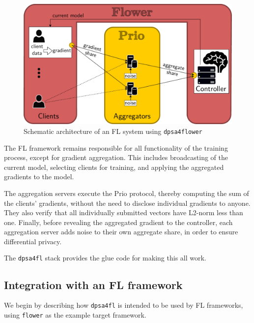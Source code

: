 \documentclass{article}
\begin{document}
\begin{figure}[h]
  \centering
  \includegraphics[width=\columnwidth]{assets/dpsa-overview-2-edit_no_explanations-2023-08-22.drawio-edit_rectangle_raw-joined-text_littleproblem-fixed-textfont-addnoise-fontsize.pdf}
  \caption{Schematic architecture of an FL system using \texttt{dpsa4flower}}
  \label{fig:architecture}
\end{figure}

The FL framework remains responsible for all functionality of the training
process, except for gradient aggregation. This includes broadcasting of the
current model, selecting clients for training, and applying the aggregated
gradients to the model.

The aggregation servers execute the Prio protocol, thereby computing the sum of
the clients' gradients, without the need to disclose individual gradients to
anyone. They also verify that all individually submitted vectors have L2-norm
less than one. Finally, before revealing the aggregated gradient to the
controller, each aggregation server adds noise to their own aggregate share, in
order to ensure differential privacy.

The \texttt{dpsa4fl} stack provides the glue code for making this all
work.

\subsection{Integration with an FL framework}
We begin by describing how \texttt{dpsa4fl} is intended to be used by FL
frameworks, using \texttt{flower} as the example target framework.
\end{document}

